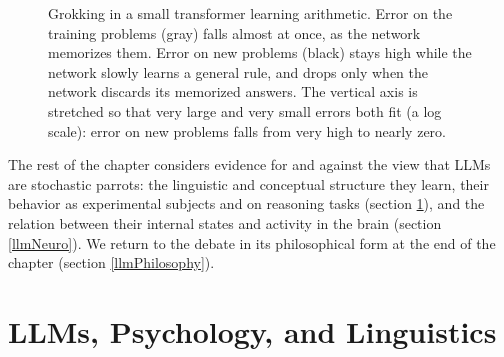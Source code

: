 \begin{figure}[ht]
\centering
{}
\caption[Adapted from \cite{nanda2023progress}.]{Grokking in a small
transformer learning arithmetic. Error on the training problems
(gray) falls almost at once, as the network memorizes them. Error on new
problems (black) stays high while the network slowly learns a general rule, and
drops only when the network discards its memorized answers. The vertical axis
is stretched so that very large and very small errors both fit (a log scale):
error on new problems falls from very high to nearly zero.}
\label{grokking}
\end{figure}

The rest of the chapter considers evidence for and against the view that LLMs
are stochastic parrots: the linguistic and conceptual structure they learn, their behavior as
experimental subjects and on reasoning tasks (section \ref{llmsBehavioral}),
and the relation between their internal states and activity in the brain
(section \ref{llmNeuro}). We return to
the debate in its philosophical form at the end of the chapter (section
\ref{llmPhilosophy}).

\section{LLMs, Psychology, and Linguistics}\label{llmsBehavioral}


